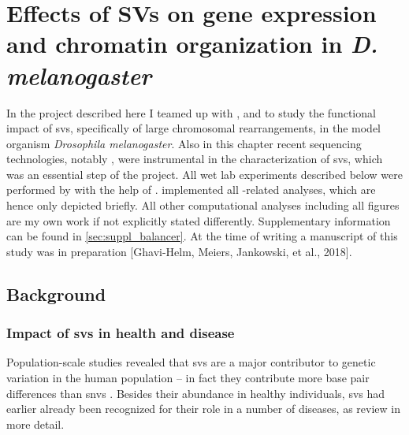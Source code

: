 \chapter{Effects of SVs on gene expression and chromatin
organization in \texorpdfstring{\textit{D. melanogaster}}{D. melanogaster}}
\label{sec:balancer}



In the project described here I teamed up with \yad, \alek and \eileen to study the functional
impact of \acp{sv}, specifically of large chromosomal rearrangements, in the model
organism \textit{Drosophila melanogaster}. Also in this chapter recent
sequencing technologies, notably \hic, were instrumental in the characterization
of \acp{sv}, which was an essential step of the project. All wet lab experiments
described below were performed by \yad with the help of \rebecca.
\alek implemented all \hic-related analyses, which are hence
only depicted briefly. All other computational analyses including all figures
are my own work if not explicitly stated differently. Supplementary information
can be found in \cref{sec:suppl_balancer}. At the time of writing a manuscript
of this study was in preparation [Ghavi-Helm, Meiers, Jankowski, et al., 2018].



\section{Background}
\label{sec:balancer_background}


\subsection{Impact of \texorpdfstring{\acsp{sv}}{SVs} in health and disease}

Population-scale studies revealed that \acp{sv} are a major contributor to
genetic variation in the human population \citep{Conrad2010} – in fact they
contribute more base pair differences than \acp{snv} \citep{Sudmant2015}.
Besides their abundance in healthy individuals, \acp{sv} had earlier already
been recognized for their role in a number of diseases, as
\citet{Zhang2009,Weischenfeldt2013,Carvalho2016} review in more detail.


